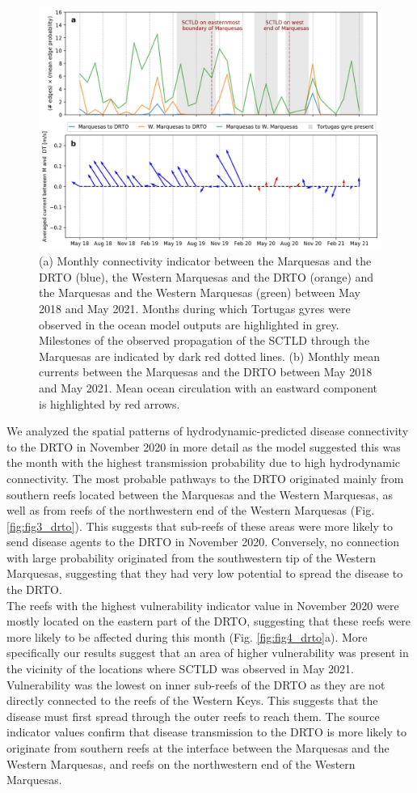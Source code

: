 \begin{figure}
    \centering
    \includegraphics[width=.9\textwidth]{chapters/drto/figures/fig2.jpg}
    \caption{(a) Monthly connectivity indicator between the Marquesas and the DRTO (blue), the Western Marquesas and the DRTO (orange) and the Marquesas and the Western Marquesas (green) between May 2018 and May 2021. Months during which Tortugas gyres were observed in the ocean model outputs are highlighted in grey. Milestones of the observed propagation of the SCTLD through the Marquesas are indicated by dark red dotted lines. (b) Monthly mean currents between the Marquesas and the DRTO between May 2018 and May 2021. Mean ocean circulation with an eastward component is highlighted by red arrows.}
    \label{fig:fig2_drto}
\end{figure}

We analyzed the spatial patterns of hydrodynamic-predicted disease connectivity to the DRTO in November 2020 in more detail as the model suggested this was the month with the highest transmission probability due to high hydrodynamic connectivity. The most probable pathways to the DRTO originated mainly from southern reefs located between the Marquesas and the Western Marquesas, as well as from reefs of the northwestern end of the Western Marquesas (Fig. \ref{fig:fig3_drto}). This suggests that sub-reefs of these areas were more likely to send disease agents to the DRTO in November 2020. Conversely, no connection with large probability originated from the southwestern tip of the Western Marquesas, suggesting that they had very low potential to spread the disease to the DRTO. \\
The reefs with the highest vulnerability indicator value in November 2020 were mostly located on the eastern part of the DRTO, suggesting that these reefs were more likely to be affected during this month (Fig. \ref{fig:fig4_drto}a). More specifically our results suggest that an area of higher vulnerability was present in the vicinity of the locations where SCTLD was observed in May 2021. Vulnerability was the lowest on inner sub-reefs of the DRTO as they are not directly connected to the reefs of the Western Keys. This suggests that the disease must first spread through the outer reefs to reach them. The source indicator values confirm that disease transmission to the DRTO is more likely to originate from southern reefs at the interface between the Marquesas and the Western Marquesas, and reefs on the northwestern end of the Western Marquesas.

